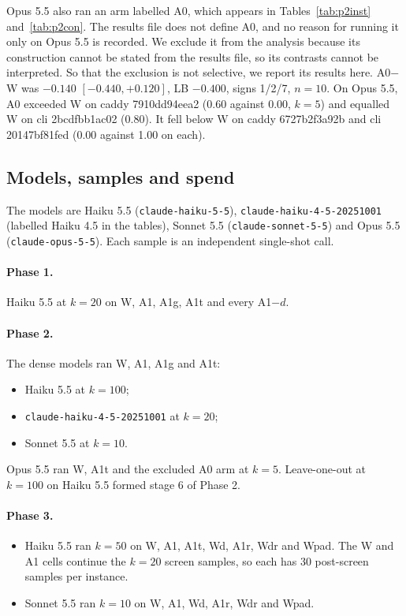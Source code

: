 Opus 5.5 also ran an arm labelled A0, which appears in Tables~\ref{tab:p2inst} and~\ref{tab:p2con}. The results file does not define A0, and no reason for running it only on Opus 5.5 is recorded. We exclude it from the analysis because its construction cannot be stated from the results file, so its contrasts cannot be interpreted. So that the exclusion is not selective, we report its results here. A0$-$W was $-0.140$ $[-0.440, +0.120]$, LB $-0.400$, signs 1/2/7, $n=10$. On Opus 5.5, A0 exceeded W on caddy 7910dd94eea2 (0.60 against 0.00, $k=5$) and equalled W on cli 2bcdfbb1ac02 (0.80). It fell below W on caddy 6727b2f3a92b and cli 20147bf81fed (0.00 against 1.00 on each).

\subsection{Models, samples and spend}

The models are Haiku 5.5 (\texttt{claude-haiku-5-5}), \texttt{claude-haiku-4-5-20251001} (labelled Haiku 4.5 in the tables), Sonnet 5.5 (\texttt{claude-sonnet-5-5}) and Opus 5.5 (\texttt{claude-opus-5-5}). Each sample is an independent single-shot call.

\paragraph{Phase 1.} Haiku 5.5 at $k=20$ on W, A1, A1g, A1t and every A1$-d$.

\paragraph{Phase 2.} The dense models ran W, A1, A1g and A1t:
\begin{itemize}
\item Haiku 5.5 at $k=100$;
\item \texttt{claude-haiku-4-5-20251001} at $k=20$;
\item Sonnet 5.5 at $k=10$.
\end{itemize}
Opus 5.5 ran W, A1t and the excluded A0 arm at $k=5$. Leave-one-out at $k=100$ on Haiku 5.5 formed stage 6 of Phase 2.

\paragraph{Phase 3.}
\begin{itemize}
\item Haiku 5.5 ran $k=50$ on W, A1, A1t, Wd, A1r, Wdr and Wpad. The W and A1 cells continue the $k=20$ screen samples, so each has 30 post-screen samples per instance.
\item Sonnet 5.5 ran $k=10$ on W, A1, Wd, A1r, Wdr and Wpad.
\end{itemize}

